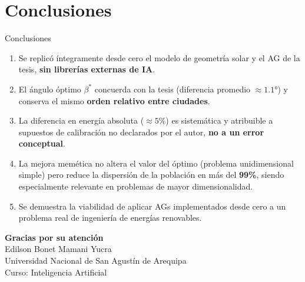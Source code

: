 \documentclass[10pt]{beamer}
\begin{document}
\section{Conclusiones}
\begin{frame}{Conclusiones}
  \begin{enumerate}
    \item Se replicó íntegramente desde cero el modelo de geometría solar y el
          AG de la tesis, \textbf{sin librerías externas de IA}.
    \item El ángulo óptimo $\beta^*$ concuerda con la tesis (diferencia
          promedio $\approx 1.1°$) y conserva el mismo \textbf{orden relativo entre ciudades}.
    \item La diferencia en energía absoluta ($\approx 5\%$) es sistemática y
          atribuible a supuestos de calibración no declarados por el autor,
          \textbf{no a un error conceptual}.
    \item La mejora memética no altera el valor del óptimo (problema
          unidimensional simple) pero reduce la dispersión de la población en
          más del \textbf{99\%}, siendo especialmente relevante en problemas
          de mayor dimensionalidad.
    \item Se demuestra la viabilidad de aplicar AGs implementados desde cero
          a un problema real de ingeniería de energías renovables.
  \end{enumerate}
\end{frame}

\begin{frame}
  \centering
  \vspace{1.5cm}
  {\Large\bfseries Gracias por su atención}\\[1.5cm]
  {\normalsize Edilson Bonet Mamani Yucra}\\[0.3em]
  {\small Universidad Nacional de San Agustín de Arequipa}\\[0.3em]
  {\small Curso: Inteligencia Artificial}
\end{frame}
\end{document}
